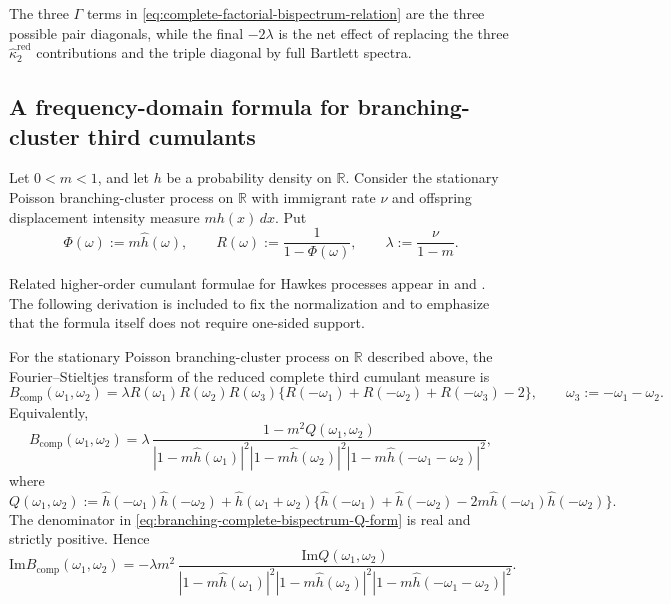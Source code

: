 \documentclass[aap,press]{apt} \volno{00} \partno{00}
\newcommand{\R}{\mathbb{R}}
\newcommand{\1}{\mathbf{1}}
\newcommand{\Imm}{\mathrm{Im}}
\numberwithin{equation}{section}
\begin{document}
The three $\Gamma$ terms in \eqref{eq:complete-factorial-bispectrum-relation} are the three possible pair diagonals, while the final $-2\lambda$ is the net effect of replacing the three $\widehat\kappa_2^{\mathrm{red}}$ contributions and the triple diagonal by full Bartlett spectra.

\subsection{A frequency-domain formula for branching-cluster third cumulants}

Let $0<m<1$, and let $h$ be a probability density on $\R$. Consider the stationary Poisson branching-cluster process on $\R$ with immigrant rate $\nu$ and offspring displacement intensity measure $m h(x)\,dx$. Put
\[
\Phi(\omega):=m\widehat h(\omega),\qquad R(\omega):=\frac{1}{1-\Phi(\omega)},\qquad \lambda:=\frac{\nu}{1-m}.
\]

Related higher-order cumulant formulae for Hawkes processes appear in \cite{JovanovicHertzRotter2015} and \cite{Privault2021}. The following derivation is included to fix the normalization and to emphasize that the formula itself does not require one-sided support.

\begin{thm}\label{thm:branching-bispectrum}
For the stationary Poisson branching-cluster process on $\R$ described above, the Fourier--Stieltjes transform of the reduced complete third cumulant measure is
\begin{equation}\label{eq:branching-complete-bispectrum-R-form}
B_{\mathrm{comp}}(\omega_1,\omega_2)
=
\lambda R(\omega_1)R(\omega_2)R(\omega_3)
\{R(-\omega_1)+R(-\omega_2)+R(-\omega_3)-2\},
\qquad \omega_3:=-\omega_1-\omega_2.
\end{equation}
Equivalently,
\begin{equation}\label{eq:branching-complete-bispectrum-Q-form}
B_{\mathrm{comp}}(\omega_1,\omega_2)
=\lambda\,
\frac{1-m^2 Q(\omega_1,\omega_2)}
{|1-m\widehat h(\omega_1)|^2 |1-m\widehat h(\omega_2)|^2 |1-m\widehat h(-\omega_1-\omega_2)|^2},
\end{equation}
where
\[
Q(\omega_1,\omega_2)
:=\widehat h(-\omega_1)\widehat h(-\omega_2)
+\widehat h(\omega_1+\omega_2)
\{\widehat h(-\omega_1)+\widehat h(-\omega_2)-2m\widehat h(-\omega_1)\widehat h(-\omega_2)\}.
\]
The denominator in \eqref{eq:branching-complete-bispectrum-Q-form} is real and strictly positive. Hence
\[
\Imm B_{\mathrm{comp}}(\omega_1,\omega_2)
=
-\lambda m^2\,
\frac{\Imm Q(\omega_1,\omega_2)}
{|1-m\widehat h(\omega_1)|^2 |1-m\widehat h(\omega_2)|^2 |1-m\widehat h(-\omega_1-\omega_2)|^2}.
\]
\end{thm}
\end{document}
